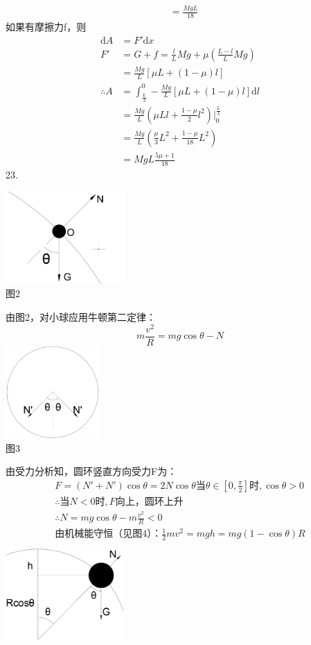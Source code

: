 \documentclass[blue, normal]{./templete/qyxfnote}
\newcommand{\di}[1]{\mathrm{d}#1}
\begin{document}
\begin{multicols}{2}
\begin{align*}
	&=\frac{MgL}{18}
	\end{align*}
	如果有摩擦力f，则
	\begin{align*}
	\di{A}	&=F'\di{x}\\
	F'		&=G+f=\frac{l}{L}Mg+\mu\left(\frac{L-l}{L}Mg\right)\\
	&=\frac{Mg}{L}[\mu L+(1-\mu)l]\\
	\therefore A&=\int_{\frac{L}{3}}^{0} -\frac{Mg}{L}[\mu L+(1-\mu)l] \di{l}\\
	&=\frac{Mg}{L}\left(\mu Ll+\frac{1-\mu}{2}l^2\right)\left.\right|_{0}^{\frac{L}{3}}\\
	&=\frac{Mg}{L}\left(\frac{\mu}{3}L^2+\frac{1-\mu}{18}L^2\right)\\
	&=MgL\frac{5\mu +1}{18}
	\end{align*}
	23.\par
	\centering\includegraphics[height=100pt]{Chp2_illus2.png}\\
	图2\\
	\raggedright 由图2，对小球应用牛顿第二定律：
	\[m\frac{v^2}{R}=mg\cos\theta-N\]
	\centering\includegraphics[height=100pt]{Chp2_illus3.png}\\
	图3\\
	\raggedright 由受力分析知，圆环竖直方向受力F为：
	\begin{gather*}
	F=(N'+N')\cos\theta=2N\cos\theta
	\text{当}\theta\in[0,\frac{\pi}{2}]\text{时},\cos\theta>0\\
	\therefore\text{当}N<0\text{时},F\text{向上，圆环上升}\\
	\therefore N=mg\cos\theta-m\frac{v^2}{R}<0\\
	\text{由机械能守恒（见图4）：}\frac{1}{2}mv^2=mgh=mg(1-\cos\theta)R\\
	\end{gather*}
	\centering\includegraphics[height=100pt]{Chp2_illus4.png}\\

\end{multicols}
\end{document}
